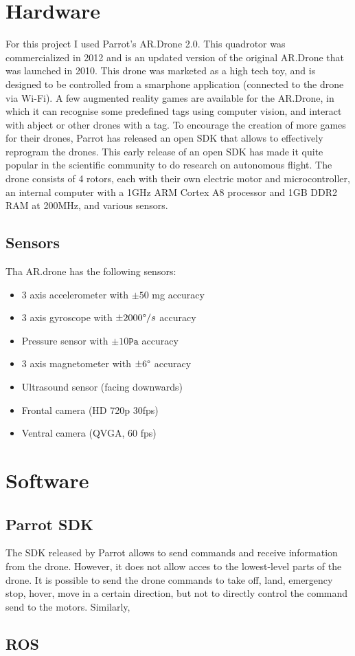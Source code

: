 \section{Hardware}
For this project I used Parrot's AR.Drone 2.0. This quadrotor was commercialized in 2012 and is an updated version of the original AR.Drone that was launched in 2010. This drone was marketed as a high tech toy, and is designed to be controlled from a smarphone application (connected to the drone via Wi-Fi). A few augmented reality games are available for the AR.Drone, in which it can recognise some predefined tags using computer vision, and interact with abject or other drones with a tag. To encourage the creation of more games for their drones, Parrot has released an open SDK that allows to effectively reprogram the drones. This early release of an open SDK has made it quite popular in the scientific community to do research on autonomous flight. The drone consists of 4 rotors, each with their own electric motor and microcontroller, an internal computer with a 1GHz ARM Cortex A8 processor and 1GB DDR2 RAM at 200MHz, and various sensors.

\subsection{Sensors}
Tha AR.drone has the following sensors:
\begin{itemize}
  \item 3 axis accelerometer with $\pm 50$ mg accuracy
  \item 3 axis gyroscope with $\pm 2000\degree/s$ accuracy
  \item Pressure sensor with $\pm 10 \texttt{Pa}$ accuracy
  \item 3 axis magnetometer with $\pm 6\degree$ accuracy
  \item Ultrasound sensor (facing downwards)
  \item Frontal camera (HD 720p 30fps)
  \item Ventral camera (QVGA, 60 fps)
\end{itemize}


\section{Software}

\subsection{Parrot SDK}
The SDK released by Parrot allows to send commands and receive information from the drone. However, it does not allow acces to the lowest-level parts of the drone. It is possible to send the drone commands to take off, land, emergency stop, hover, move in a certain direction, but not to directly control the command send to the motors. Similarly,


\subsection{ROS}
